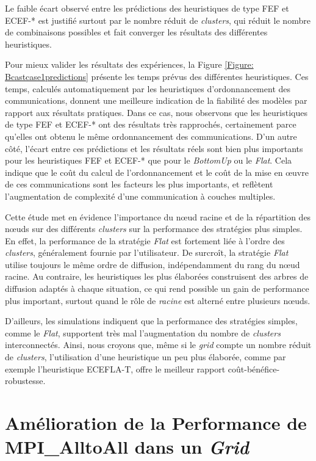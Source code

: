 Le faible écart observé entre les prédictions des heuristiques de
type FEF et ECEF-{*} est justifié surtout par le nombre réduit de
\textit{clusters}, qui réduit le nombre de combinaisons possibles et fait converger
les résultats des différentes heuristiques. 

Pour mieux valider les résultats des expériences, la Figure \ref{Figure: Bcastcase1predictions}
présente les temps prévus des différentes heuristiques. Ces temps,
calculés automatiquement par les heuristiques d'ordonnancement des
communications, donnent une meilleure indication de la fiabilité des
modèles par rapport aux résultats pratiques. Dans ce cas, nous observons
que les heuristiques de type FEF et ECEF-{*} ont des résultats très
rapprochés, certainement parce qu'elles ont obtenu le même ordonnancement
des communications. D'un autre côté, l'écart entre ces prédictions
et les résultats réels sont bien plus importants pour les heuristiques
FEF et ECEF-{*} que pour le \textit{BottomUp} ou le \textit{Flat}. Cela indique que
le coût du calcul de l'ordonnancement et le coût de la mise en {\oe}uvre
de ces communications sont les facteurs les plus importants, et reflètent
l'augmentation de complexité d'une communication à couches multiples.

Cette étude met en évidence l'importance
du n{\oe}ud racine et de la répartition des n{\oe}uds sur des différents
\textit{clusters} sur la performance des stratégies plus simples. En effet,
la performance de la stratégie \textit{Flat} est fortement liée à l'ordre des \textit{clusters}, généralement fournie par l'utilisateur.
De surcroît, la stratégie \textit{Flat} utilise toujours le même ordre de diffusion,
indépendamment du rang du n{\oe}ud racine. Au contraire, les heuristiques
les plus élaborées construisent des arbres de diffusion adaptés à
chaque situation, ce qui rend possible un gain de performance plus
important, surtout quand le rôle de \emph{racine} est alterné entre
plusieurs n{\oe}uds.

D'ailleurs, les simulations indiquent que la performance des stratégies
simples, comme le \textit{Flat}, supportent très mal l'augmentation du nombre
de \textit{clusters} interconnectés.  Ainsi, nous croyons que, même si
le \textit{grid} compte un nombre réduit de \textit{clusters}, l'utilisation d'une
heuristique un peu plus élaborée, comme par exemple l'heuristique
ECEFLA-T, offre le meilleur rapport coût-bénéfice-robustesse.


\section{Amélioration de la Performance de MPI\_AlltoAll dans un \textit{Grid}}

